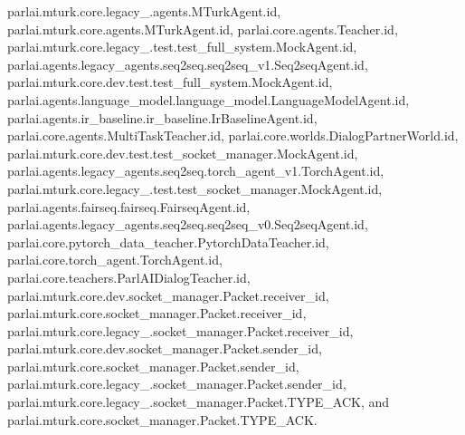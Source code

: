 parlai.\+mturk.\+core.\+legacy\+\_.\+agents.\+M\+Turk\+Agent.\+id, parlai.\+mturk.\+core.\+agents.\+M\+Turk\+Agent.\+id, parlai.\+core.\+agents.\+Teacher.\+id, parlai.\+mturk.\+core.\+legacy\+\_.\+test.\+test\+\_\+full\+\_\+system.\+Mock\+Agent.\+id, parlai.\+agents.\+legacy\+\_\+agents.\+seq2seq.\+seq2seq\+\_\+v1.\+Seq2seq\+Agent.\+id, parlai.\+mturk.\+core.\+dev.\+test.\+test\+\_\+full\+\_\+system.\+Mock\+Agent.\+id, parlai.\+agents.\+language\+\_\+model.\+language\+\_\+model.\+Language\+Model\+Agent.\+id, parlai.\+agents.\+ir\+\_\+baseline.\+ir\+\_\+baseline.\+Ir\+Baseline\+Agent.\+id, parlai.\+core.\+agents.\+Multi\+Task\+Teacher.\+id, parlai.\+core.\+worlds.\+Dialog\+Partner\+World.\+id, parlai.\+mturk.\+core.\+dev.\+test.\+test\+\_\+socket\+\_\+manager.\+Mock\+Agent.\+id, parlai.\+agents.\+legacy\+\_\+agents.\+seq2seq.\+torch\+\_\+agent\+\_\+v1.\+Torch\+Agent.\+id, parlai.\+mturk.\+core.\+legacy\+\_.\+test.\+test\+\_\+socket\+\_\+manager.\+Mock\+Agent.\+id, parlai.\+agents.\+fairseq.\+fairseq.\+Fairseq\+Agent.\+id, parlai.\+agents.\+legacy\+\_\+agents.\+seq2seq.\+seq2seq\+\_\+v0.\+Seq2seq\+Agent.\+id, parlai.\+core.\+pytorch\+\_\+data\+\_\+teacher.\+Pytorch\+Data\+Teacher.\+id, parlai.\+core.\+torch\+\_\+agent.\+Torch\+Agent.\+id, parlai.\+core.\+teachers.\+Parl\+A\+I\+Dialog\+Teacher.\+id, parlai.\+mturk.\+core.\+dev.\+socket\+\_\+manager.\+Packet.\+receiver\+\_\+id, parlai.\+mturk.\+core.\+socket\+\_\+manager.\+Packet.\+receiver\+\_\+id, parlai.\+mturk.\+core.\+legacy\+\_.\+socket\+\_\+manager.\+Packet.\+receiver\+\_\+id, parlai.\+mturk.\+core.\+dev.\+socket\+\_\+manager.\+Packet.\+sender\+\_\+id, parlai.\+mturk.\+core.\+socket\+\_\+manager.\+Packet.\+sender\+\_\+id, parlai.\+mturk.\+core.\+legacy\+\_.\+socket\+\_\+manager.\+Packet.\+sender\+\_\+id, parlai.\+mturk.\+core.\+legacy\+\_.\+socket\+\_\+manager.\+Packet.\+T\+Y\+P\+E\+\_\+\+A\+CK, and parlai.\+mturk.\+core.\+socket\+\_\+manager.\+Packet.\+T\+Y\+P\+E\+\_\+\+A\+CK.

\mbox{\label{classparlai_1_1mturk_1_1core_1_1socket__manager_1_1Packet_af13faca81d70ad1768e6dd0089c8e082}} 
